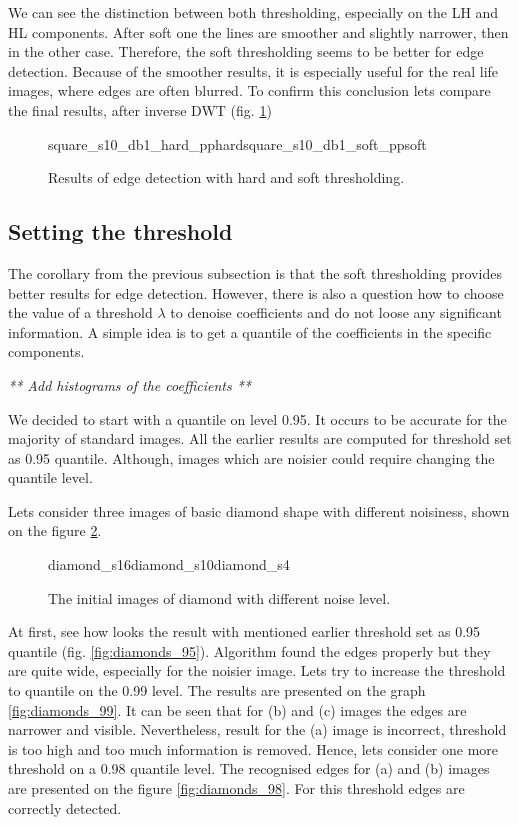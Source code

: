 We can see the distinction between both thresholding, especially on the LH and HL components. After soft one the lines are smoother and slightly narrower, then in the other case. Therefore, the soft thresholding seems to be better for edge detection. Because of the smoother results, it is especially useful for the real life images, where edges are often blurred. To confirm this conclusion lets compare the final results, after inverse DWT (fig. \ref{fig:square_s10_idwt_pp})

\begin{figure}[h]
	\begin{subdiagrams2}{square_s10_db1_hard_pp}{hard}{square_s10_db1_soft_pp}{soft}
	\end{subdiagrams2}
	\centering
	\caption{Results of edge detection with hard and soft thresholding.}
	\label{fig:square_s10_idwt_pp}
\end{figure}

\subsection{Setting the threshold}
The corollary from the previous subsection is that the soft thresholding provides better results for edge detection. However, there is also a question how to choose the value of a threshold $\lambda$ to denoise coefficients and do not loose any significant information. A simple idea is to get a quantile of the coefficients in the specific components. 

\textit{** Add histograms of the coefficients **}

We decided to start with a quantile on level 0.95. It occurs to be accurate for the majority of standard images. All the earlier results are computed for threshold set as 0.95 quantile. Although, images which are noisier could require changing the quantile level.

Lets consider three images of basic diamond shape with different noisiness, shown on the figure \ref{fig:diamonds}.

\begin{figure}[h]
	\begin{subdiagrams3}{diamond_s16}{}{diamond_s10}{}{diamond_s4}{}
	\end{subdiagrams3}
	\centering
	\caption{The initial images of diamond with different noise level.}
	\label{fig:diamonds}
\end{figure}

At first, see how looks the result with mentioned earlier threshold set as 0.95 quantile (fig. \ref{fig:diamonds_95}). Algorithm found the edges properly but they are quite wide, especially for the noisier image. Lets try to increase the threshold to quantile on the 0.99 level. The results are presented on the graph \ref{fig:diamonds_99}. It can be seen that for (b) and (c) images the edges are narrower and visible. Nevertheless, result for the (a) image is incorrect, threshold is too high and too much information is removed. Hence, lets consider one more threshold on a 0.98 quantile level. The recognised edges for (a) and (b) images are presented on the figure \ref{fig:diamonds_98}. For this threshold edges are correctly detected.

